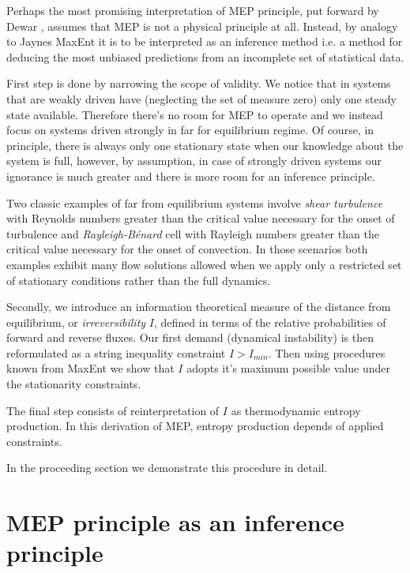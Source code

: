 \documentclass[a4paper,12pt]{article}
\begin{document}
Perhaps the most promising interpretation of MEP principle, put forward by Dewar %
, assumes that MEP is not a physical principle at all. Instead, by analogy to Jaynes MaxEnt it is to be interpreted as an inference method i.e. a method for deducing the most unbiased predictions from an incomplete set of statistical data. 

First step is done by narrowing the scope of validity. We notice that in systems that are weakly driven have (neglecting the set of measure zero) only one steady state available. Therefore there's no room for MEP to operate and we instead focus on systems driven strongly in far for equilibrium regime. Of course, in principle, there is always only one stationary state when our knowledge about the system is full, however, by assumption, in case of strongly driven systems our ignorance is much greater and there is more room for an inference principle. 

Two classic examples of far from equilibrium systems involve \textit{shear turbulence} with Reynolds numbers greater than the critical value necessary for the onset of turbulence and \textit{Rayleigh-Bénard} cell with Rayleigh numbers greater than the critical value necessary for the onset of convection.
In those scenarios both examples exhibit many flow solutions allowed when we apply only a restricted set of stationary conditions rather than the full dynamics.

Secondly, we introduce an information theoretical measure of the distance from equilibrium, or \textit{irreversibility} $I$, defined in terms of the relative probabilities of forward and reverse fluxes. 
Our first demand (dynamical instability) is then reformulated as a string inequality constraint $I>I_{min}$. 
Then using procedures known from MaxEnt we show that $I$ adopts it's maximum possible value under the stationarity constraints.

The final step consists of reinterpretation of $I$ as thermodynamic entropy production. %
In this derivation of MEP, entropy production depends of applied constraints.

In the proceeding section we demonstrate this procedure in detail.



\section{MEP principle as an inference principle}
\end{document}
